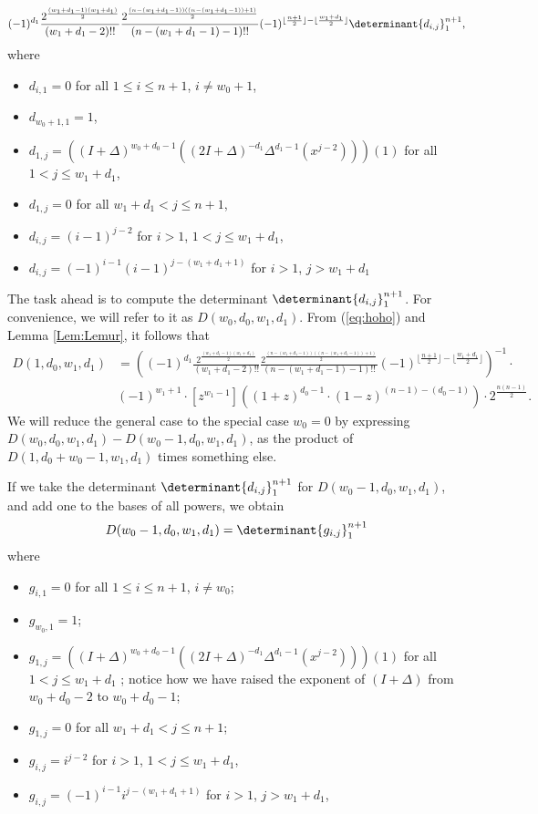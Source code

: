 \documentclass[10pt,reqno]{amsart}
\theoremstyle{plain}
\theoremstyle{definition}
\theoremstyle{remark}
\begin{document}
\begin{equation}
(-1)^{d_1}
\frac{2^{\frac{(w_1+d_1-1)(w_1+d_1)}{2}}}{(w_1+d_1-2)!!}
\frac{2^{\frac{(n-(w_1+d_1-1))((n-(w_1+d_1-1))+1)}{2}}}{(n-(w_1+d_1-1)-1)!!}
(-1)^{\lfloor \frac{n+1}{2} \rfloor - \lfloor \frac{w_1+d_1}{2} \rfloor}
\determinant{d_{i,j}}_1^{n+1},
\label{eq:hoho}
\end{equation} 
where 
\begin{itemize}
\item
$d_{i,1}=0$ for all $1\leq i\leq n+1$, $i\ne w_0+1$,
\item
$d_{w_0+1,1}=1$,
\item
$d_{1,j} = ((I+\Delta)^{w_0+d_0-1}
((2I+\Delta)^{-d_1}\Delta^{d_1-1}(x^{j-2})))(1)$
           for all $1<j\leq w_1+d_1$,
\item
$d_{1,j} = 0$ for all $w_1+d_1<j\leq n+1$,
\item $d_{i,j} = (i-1)^{j-2}$ for $i>1$, $1<j\leq w_1+d_1$,
\item $d_{i,j} = (-1)^{i-1} (i-1)^{j-(w_1+d_1+1)}$ for $i>1$, $j>w_1+d_1$
\end{itemize}

The task ahead is to compute the determinant $\determinant{d_{i,j}}_1^{n+1}$.
For convenience, we will refer to it as $D(w_0,d_0,w_1,d_1)$.
From (\ref{eq:hoho}) and Lemma \ref{Lem:Lemur}, it follows that
\[
\begin{aligned}
D(1,d_0,w_1,d_1) &= 
((-1)^{d_1}
\frac{2^{\frac{(w_1+d_1-1)(w_1+d_1)}{2}}}{(w_1+d_1-2)!!}
\frac{2^{\frac{(n-(w_1+d_1-1))((n-(w_1+d_1-1))+1)}{2}}}{(n-(w_1+d_1-1)-1)!!}
(-1)^{\lfloor \frac{n+1}{2} \rfloor - \lfloor \frac{w_1+d_1}{2} \rfloor})^{-1}
\cdot \\
&(-1)^{w_1+1}\cdot
[z^{w_1-1}]((1+z)^{d_0-1} \cdot (1-z)^{(n-1)-(d_0-1)})\cdot
2^{\frac{n(n-1)}{2}}.
\end{aligned}
\]
We will reduce the general case to the special
case $w_0=0$ by expressing
$D(w_0,d_0,w_1,d_1)-D(w_0-1,d_0,w_1,d_1)$, as the product of
$D(1,d_0+w_0-1,w_1,d_1)$ times something else.

If we take the determinant $\determinant{d_{i,j}}_1^{n+1}$ for
$D(w_0-1,d_0,w_1,d_1)$, and add one to the bases of all powers, we
obtain
\begin{equation}
D(w_0-1,d_0,w_1,d_1) = \determinant{g_{i,j}}_1^{n+1}
\end{equation}
where
\begin{itemize}
\item $g_{i,1} = 0$ for all $1\leq i \leq n+1$, $i\ne w_0$;
\item $g_{w_0,1} = 1$;
\item $g_{1,j} = ((I+\Delta)^{w_0+d_0-1}
((2I+\Delta)^{-d_1}\Delta^{d_1-1}(x^{j-2})))(1)$ for all
$1<j\leq w_1+d_1$
; notice
how we have raised the exponent of $(I+\Delta)$ from $w_0+d_0-2$
to $w_0+d_0-1$;
\item $g_{1,j} = 0$ for all $w_1+d_1<j\leq n+1$;
\item $g_{i,j} = i^{j-2}$ for $i>1$, $1<j\leq w_1+d_1$,
\item $g_{i,j} = (-1)^{i-1} i^{j-(w_1+d_1+1)}$ for $i>1$, $j>w_1+d_1$,
\end{itemize}
\end{document}
